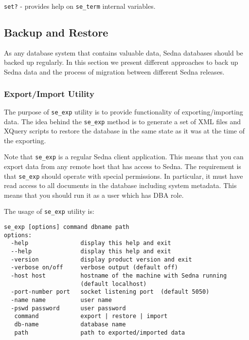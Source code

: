 \documentclass[a4paper,12pt]{article}
\begin{document}
\verb!set?! - provides help on \verb!se_term! internal variables.


\subsection{Backup and Restore}

As any database system that contains valuable data, Sedna databases should be
backed up regularly. In this section we present different approaches to back up
Sedna data and the process of migration between different Sedna releases.

\subsubsection{Export/Import Utility}

The purpose of \verb!se_exp! utility is to provide functionality of
exporting/importing data. The idea behind the \verb!se_exp! method is to
generate a set of XML files and XQuery scripts to restore the database in the
same state as it was at the time of the exporting.

Note that \verb!se_exp! is a regular Sedna client application. This means that
you can export data from any remote host that has access to Sedna. The
requirement is that \verb!se_exp! should operate with special permissions. In
particular, it must have read access to all documents in the database including
system metadata. This means that you should run it as a user which has DBA role.

The usage of \verb!se_exp! utility is:

\small{
\begin{verbatim}
se_exp [options] command dbname path
options:
  -help               display this help and exit
  --help              display this help and exit
  -version            display product version and exit
  -verbose on/off     verbose output (default off)
  -host host          hostname of the machine with Sedna running
                      (default localhost)
  -port-number port   socket listening port  (default 5050)
  -name name          user name
  -pswd password      user password
   command            export | restore | import
   db-name            database name
   path               path to exported/imported data
\end{verbatim}}
\end{document}

